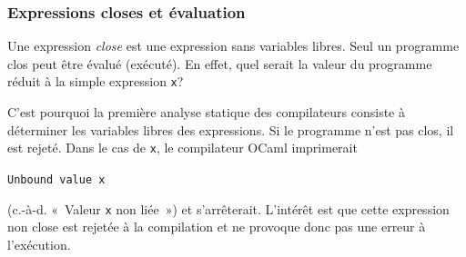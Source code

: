 %
\begin{frame}[containsverbatim]
\frametitle{Expressions closes et évaluation}

Une expression \emph{close} est une expression sans variables
libres. Seul un programme clos peut être évalué (exécuté). En effet,
quel serait la valeur du programme réduit à la simple expression
\verb|x|?

C'est pourquoi la première analyse statique des compilateurs consiste
à déterminer les variables libres des expressions. Si le programme
n'est pas clos, il est rejeté. Dans le cas de \verb|x|, le compilateur
OCaml imprimerait
\begin{center}
\texttt{Unbound value x}
\end{center}
(c.-à-d. «~Valeur \texttt{x} non liée~») et s'arrêterait. L'intérêt
est que cette expression non close est rejetée à la compilation et ne
provoque donc pas une erreur à l'exécution.

\end{frame}
